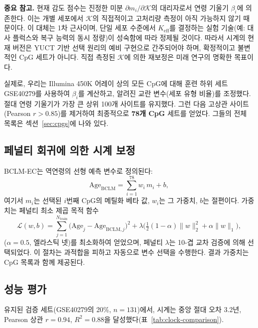 \documentclass[12pt,a4paper]{article}
\newcommand{\REL}{\mathcal{K}}          %
\begin{document}
	\textbf{중요 참고.}
	현재 감도 점수는 진정한 미분 \(\partial m_i/\partial \REL\)의 대리자로서 연령 기울기 \(\beta_i\)에 의존한다. 이는 개별 세포에서 \(\REL\)의 직접적이고 고처리량 측정이 아직 가능하지 않기 때문이다.
	이 대체는 1차 근사이며, 단일 세포 수준에서 \(K_{\mathrm{eff}}\)를 결정하는 실험 기술(예: 대사 플럭스와 복구 능력의 동시 정량)이 성숙함에 따라 정제될 것이다.
	따라서 시계의 현재 버전은 YUCT 기반 선택 원리의 예비 구현으로 간주되어야 하며, 확정적이고 불변적인 CpG 세트가 아니다. 직접 측정된 \(\REL\)에 의한 재보정은 미래 연구의 명확한 목표이다.
	
	실제로, 우리는 Illumina 450K 어레이 상의 모든 CpG에 대해 훈련 하위 세트 GSE40279를 사용하여 \(\beta_i\)를 계산하고, 알려진 교란 변수(세포 유형 비율)를 조정했다. 절대 연령 기울기가 가장 큰 상위 100개 사이트를 유지했다. 그런 다음 고상관 사이트(Pearson \(r > 0.85\))를 제거하여 최종적으로 \textbf{78개 CpG} 세트를 얻었다. 그들의 전체 목록은 섹션~\ref{sec:cpgs}에 나와 있다.
	
	\subsection{페널티 회귀에 의한 시계 보정}
	BCLM-EC는 역연령의 선형 예측 변수로 정의된다:
	\begin{equation}
		\mathrm{Age}_{\mathrm{BCLM}} = \sum_{i=1}^{78} w_i \, m_i + b,
		\label{eq:clock}
	\end{equation}
	여기서 \(m_i\)는 선택된 \(i\)번째 CpG의 메틸화 베타 값, \(w_i\)는 그 가중치, \(b\)는 절편이다. 가중치는 페널티 최소 제곱 목적 함수
	\[
	\mathcal{L}(w,b) = \sum_{j=1}^{N_{\mathrm{train}}} \bigl( \mathrm{Age}_j - \mathrm{Age}_{\mathrm{BCLM},j} \bigr)^2 + \lambda \bigl( \tfrac{1}{2}(1-\alpha)\|w\|_2^2 + \alpha\|w\|_1 \bigr),
	\]
	(\(\alpha=0.5\), 엘라스틱 넷)를 최소화하여 얻었으며, 페널티 \(\lambda\)는 10-겹 교차 검증에 의해 선택되었다. 이 절차는 과적합을 피하고 자동으로 변수 선택을 수행한다. 결과 가중치는 CpG 목록과 함께 제공된다.
	
	\subsection{성능 평가}
	유지된 검증 세트(GSE40279의 20\%, \(n=131\))에서, 시계는 중앙 절대 오차 3.2년, Pearson 상관 \(r=0.94\), \(R^2=0.88\)을 달성했다(표~\ref{tab:clock-comparison}).
	
\end{document}
